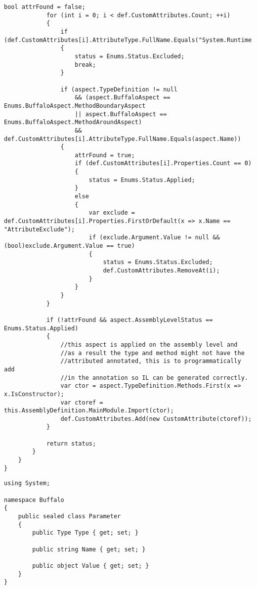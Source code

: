 \begin{lstlisting}[caption={../buffalo/Weaver.cs}, label=../buffalo/Weaver.cs, frame=tb, basicstyle=\scriptsize]
            bool attrFound = false;
            for (int i = 0; i < def.CustomAttributes.Count; ++i)
            {
                if (def.CustomAttributes[i].AttributeType.FullName.Equals("System.Runtime.CompilerServices.CompilerGeneratedAttribute"))
                {
                    status = Enums.Status.Excluded;
                    break;
                }

                if (aspect.TypeDefinition != null
                    && (aspect.BuffaloAspect == Enums.BuffaloAspect.MethodBoundaryAspect
                    || aspect.BuffaloAspect == Enums.BuffaloAspect.MethodAroundAspect)
                    && def.CustomAttributes[i].AttributeType.FullName.Equals(aspect.Name))
                {
                    attrFound = true;
                    if (def.CustomAttributes[i].Properties.Count == 0)
                    {
                        status = Enums.Status.Applied;
                    }
                    else
                    {
                        var exclude = def.CustomAttributes[i].Properties.FirstOrDefault(x => x.Name == "AttributeExclude");
                        if (exclude.Argument.Value != null && (bool)exclude.Argument.Value == true)
                        {
                            status = Enums.Status.Excluded;
                            def.CustomAttributes.RemoveAt(i);
                        }
                    }
                }
            }

            if (!attrFound && aspect.AssemblyLevelStatus == Enums.Status.Applied)
            {
                //this aspect is applied on the assembly level and
                //as a result the type and method might not have the
                //attributed annotated, this is to programmatically add
                //in the annotation so IL can be generated correctly.
                var ctor = aspect.TypeDefinition.Methods.First(x => x.IsConstructor);
                var ctoref = this.AssemblyDefinition.MainModule.Import(ctor);
                def.CustomAttributes.Add(new CustomAttribute(ctoref));
            }

            return status;
        }
    }
}\end{lstlisting}

\begin{lstlisting}[caption={../buffalo/Parameter.cs}, label=../buffalo/Parameter.cs, frame=tb, basicstyle=\scriptsize]﻿using System;

namespace Buffalo
{
    public sealed class Parameter
    {
        public Type Type { get; set; }

        public string Name { get; set; }

        public object Value { get; set; }
    }
}
\end{lstlisting}

